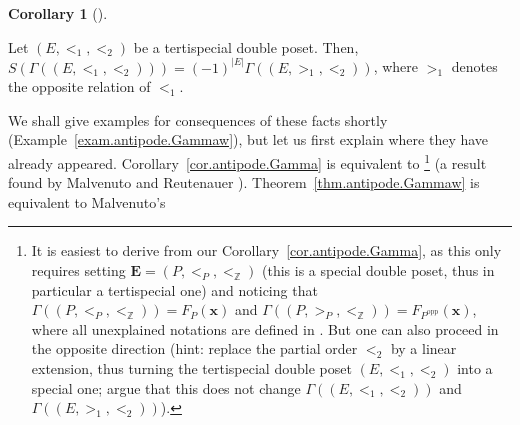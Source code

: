 \documentclass[numbers=enddot,12pt,final,onecolumn,notitlepage,abstracton]{scrartcl}%
\theoremstyle{definition}
\newtheorem{coro}[theo]{Corollary}
\newenvironment{corollary}[1][]
{\begin{coro}[#1]\begin{leftbar}}
{\end{leftbar}\end{coro}}
\newcommand{\xx}{{\mathbf{x}}}
\newcommand{\EE}{{\mathbf{E}}}
\newcommand{\ZZ}{{\mathbb{Z}}}
\begin{document}
\begin{corollary}
\label{cor.antipode.Gamma}
Let $\left(E, <_1, <_2\right)$ be a tertispecial double poset.
Then, $S\left(\Gamma\left(\left(E, <_1, <_2\right)\right)\right)
= \left(-1\right)^{\left|E\right|}
\Gamma\left(\left(E, >_1, <_2\right)\right)$,
where $>_1$ denotes the opposite relation of $<_1$.
\end{corollary}

We shall give examples for consequences of these facts shortly
(Example~\ref{exam.antipode.Gammaw}), but
let us first explain where they have already appeared.
Corollary~\ref{cor.antipode.Gamma} is equivalent to
\cite[Corollary 5.27]{Reiner}\footnote{It is easiest to derive
\cite[Corollary 5.27]{Reiner} from our Corollary~\ref{cor.antipode.Gamma},
as this only requires setting $\EE = \left(P, <_P, <_{\ZZ}\right)$
(this is a special double poset, thus in particular a tertispecial
one) and noticing that
$\Gamma\left(\left(P, <_P, <_{\ZZ}\right)\right)
= F_P\left(\xx\right)$ and
$\Gamma\left(\left(P, >_P, <_{\ZZ}\right)\right)
= F_{P^{\operatorname{opp}}}\left(\xx\right)$, where all unexplained
notations are defined in \cite[Chapter 5]{Reiner}. But one can also
proceed in the opposite direction (hint: replace the partial order
$<_2$ by a linear extension, thus turning the tertispecial double
poset $\left(E, <_1, <_2\right)$ into a special one; argue that
this does not change $\Gamma\left(\left(E, <_1, <_2\right)\right)$
and $\Gamma\left(\left(E, >_1, <_2\right)\right)$).}
(a result found by Malvenuto and Reutenauer
\cite[Lemma 3.2]{Mal-Reu}).
Theorem~\ref{thm.antipode.Gammaw} is equivalent to Malvenuto's
\end{document}
